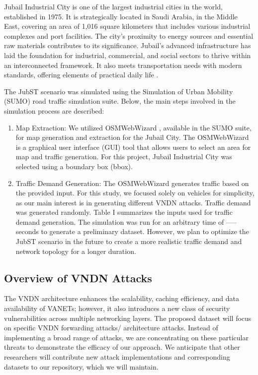 \documentclass[journal,comsoc]{IEEEtran}
\begin{document}
Jubail Industrial City is one of the largest industrial cities in the world, established in 1975. It is strategically located in Saudi Arabia, in the Middle East, covering an area of 1,016 square kilometers that includes various industrial complexes and port facilities. The city's proximity to energy sources and essential raw materials contributes to its significance. Jubail's advanced infrastructure has laid the foundation for industrial, commercial, and social sectors to thrive within an interconnected framework. It also meets transportation needs with modern standards, offering elements of practical daily life \cite{RCJY_Jubail_2025}.

The JubST scenario was simulated using the Simulation of Urban Mobility (SUMO) \cite {Krajzewicz_SUMO_2012} road traffic simulation suite. Below, the main steps involved in the simulation process are described:

\begin{enumerate}
    \item Map Extraction: We utilized OSMWebWizard \cite{OSMWebWizard_SUMO_2025}, available in the SUMO suite, for map generation and extraction for the Jubail City. The OSMWebWizard is a graphical user interface (GUI) tool that allows users to select an area for map and traffic generation. For this project, Jubail Industrial City was selected using a boundary box (bbox).
    \item Traffic Demand Generation: The OSMWebWizard generates traffic based on the provided input. For this study, we focused solely on vehicles for simplicity, as our main interest is in generating different VNDN attacks. Traffic demand was generated randomly. Table I summarizes the inputs used for traffic demand generation. The simulation was run for an arbitrary time of ----- seconds to generate a preliminary dataset. However, we plan to optimize the JubST scenario in the future to create a more realistic traffic demand and network topology for a longer duration.
\end{enumerate}

\subsection{Overview of VNDN Attacks}

The VNDN architecture enhances the scalability, caching efficiency, and data availability of VANETs; however, it also introduces a new class of security vulnerabilities across multiple networking layers. The proposed dataset will focus on specific VNDN forwarding attacks/ architecture attacks. Instead of implementing a broad range of attacks, we are concentrating on these particular threats to demonstrate the efficacy of our approach. We anticipate that other researchers will contribute new attack implementations and corresponding datasets to our repository, which we will maintain.
\end{document}

